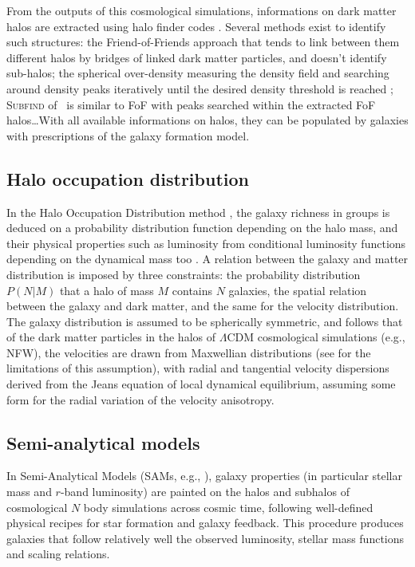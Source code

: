From the outputs of this cosmological simulations, informations on dark matter
halos are extracted using halo finder codes \citep{KK+09, Tweed+09,
Planelles+10}. Several methods exist to identify such structures: the
Friend-of-Friends approach \citep{Davis+85} that tends to link between them
different halos by bridges of linked dark matter particles, and doesn't
identify sub-halos; the spherical over-density measuring the density field and
searching around density peaks iteratively until the desired density threshold
is reached \citep{PS+74}; \textsc{Subfind} of~\cite{Springel+01} is similar to
FoF with peaks searched within the extracted FoF halos\ldots With all available
informations on halos, they can be populated by galaxies with prescriptions of
the galaxy formation model.

\subsection{Halo occupation distribution}
\label{sub:halo_occupation_distribution}

In the Halo Occupation Distribution method \citep{MS02,BW02,Zehavi+11}, the
galaxy richness in groups is deduced on a probability distribution function
depending on the halo mass, and their physical properties such as luminosity
from conditional luminosity functions depending on the dynamical mass too
\citep{YMvdB03}. A relation between the galaxy and matter distribution is
imposed by three constraints: the probability distribution $P \left(N|M\right)$
that a halo of mass $M$ contains $N$ galaxies, the spatial relation between the
galaxy and dark matter, and the same for the velocity distribution. The galaxy
distribution is assumed to be spherically symmetric, and follows that of the
dark matter particles in the halos of $\Lambda$CDM cosmological simulations
(e.g., NFW), the velocities are drawn from Maxwellian distributions (see
\citealp{Beraldo+14} for the limitations of this assumption), with radial and
tangential velocity dispersions derived from the Jeans equation of local
dynamical equilibrium, assuming some form for the radial variation of the
velocity anisotropy.

\subsection{Semi-analytical models}
\label{sub:semi_analytical_models}

In  Semi-Analytical Models (SAMs, e.g., \citealp{RQPR97,KCDW99}), galaxy
properties (in particular stellar mass and $r$-band luminosity) are painted on
the halos and subhalos of cosmological $N$ body simulations across cosmic time,
following well-defined physical recipes for star formation and galaxy feedback.
This procedure produces galaxies that follow relatively well the observed
luminosity, stellar mass functions and scaling relations.

